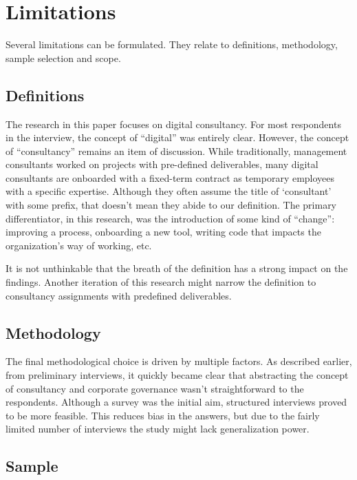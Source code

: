 \documentclass[12pt]{article}
\begin{document}
\section{Limitations}\label{limitations}

Several limitations can be formulated. They relate to definitions,
methodology, sample selection and scope.

\subsection{Definitions}\label{definitions}

The research in this paper focuses on digital consultancy. For most
respondents in the interview, the concept of ``digital'' was entirely
clear. However, the concept of ``consultancy'' remains an item of
discussion. While traditionally, management consultants worked on
projects with pre-defined deliverables, many digital consultants are
onboarded with a fixed-term contract as temporary employees with a
specific expertise. Although they often assume the title of `consultant'
with some prefix, that doesn't mean they abide to our definition. The
primary differentiator, in this research, was the introduction of some
kind of ``change'': improving a process, onboarding a new tool, writing
code that impacts the organization's way of working, etc.

It is not unthinkable that the breath of the definition has a strong
impact on the findings. Another iteration of this research might narrow
the definition to consultancy assignments with predefined deliverables.

\subsection{Methodology}\label{methodology-1}

The final methodological choice is driven by multiple factors. As
described earlier, from preliminary interviews, it quickly became clear
that abstracting the concept of consultancy and corporate governance
wasn't straightforward to the respondents. Although a survey was the
initial aim, structured interviews proved to be more feasible. This
reduces bias in the answers, but due to the fairly limited number of
interviews the study might lack generalization power.

\subsection{Sample}\label{sample}
\end{document}
